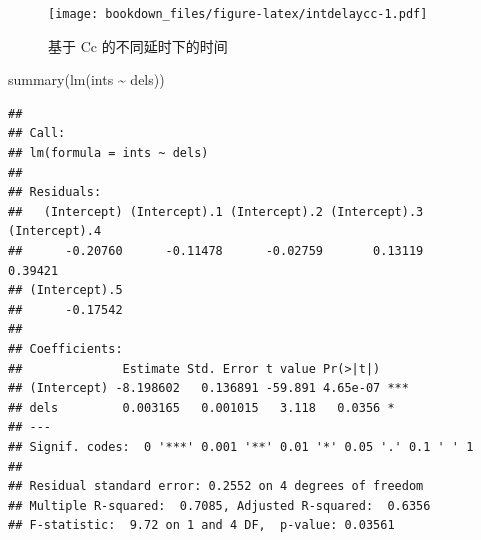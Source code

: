 \documentclass[
]{krantz}
\makeatletter
\newenvironment{Shaded}{\begin{snugshade}}{\end{snugshade}}
\newcommand{\DecValTok}[1]{\textcolor[rgb]{0.00,0.00,0.81}{#1}}
\newcommand{\FunctionTok}[1]{\textcolor[rgb]{0.00,0.00,0.00}{#1}}
\newcommand{\NormalTok}[1]{#1}
\newcommand{\OtherTok}[1]{\textcolor[rgb]{0.56,0.35,0.01}{#1}}
\newcommand{\SpecialCharTok}[1]{\textcolor[rgb]{0.00,0.00,0.00}{#1}}
\newenvironment{kframe}{%
\medskip{}
\setlength{\fboxsep}{.8em}
 \def\at@end@of@kframe{}%
 \ifinner\ifhmode%
  \def\at@end@of@kframe{\end{minipage}}%
  \begin{minipage}{\columnwidth}%
 \fi\fi%
 \def\FrameCommand##1{\hskip\@totalleftmargin \hskip-\fboxsep
 \colorbox{shadecolor}{##1}\hskip-\fboxsep
     \hskip-\linewidth \hskip-\@totalleftmargin \hskip\columnwidth}%
 \MakeFramed {\advance\hsize-\width
   \@totalleftmargin\z@ \linewidth\hsize
   \@setminipage}}%
 {\par\unskip\endMakeFramed%
 \at@end@of@kframe}
\renewenvironment{Shaded}{\begin{kframe}}{\end{kframe}}
\makeatother
\begin{document}
\begin{Shaded}
\end{Shaded}

\begin{figure}
\centering
\texttt{[image: bookdown\_files/figure-latex/intdelaycc-1.pdf]}
\caption{\label{fig:intdelaycc}基于 Cc 的不同延时下的时间}
\end{figure}

\begin{Shaded}
\begin{Highlighting}[]
\FunctionTok{summary}\NormalTok{(}\FunctionTok{lm}\NormalTok{(ints }\SpecialCharTok{\textasciitilde{}}\NormalTok{ dels))}
\end{Highlighting}
\end{Shaded}

\begin{verbatim}
## 
## Call:
## lm(formula = ints ~ dels)
## 
## Residuals:
##   (Intercept) (Intercept).1 (Intercept).2 (Intercept).3 (Intercept).4 
##      -0.20760      -0.11478      -0.02759       0.13119       0.39421 
## (Intercept).5 
##      -0.17542 
## 
## Coefficients:
##              Estimate Std. Error t value Pr(>|t|)    
## (Intercept) -8.198602   0.136891 -59.891 4.65e-07 ***
## dels         0.003165   0.001015   3.118   0.0356 *  
## ---
## Signif. codes:  0 '***' 0.001 '**' 0.01 '*' 0.05 '.' 0.1 ' ' 1
## 
## Residual standard error: 0.2552 on 4 degrees of freedom
## Multiple R-squared:  0.7085, Adjusted R-squared:  0.6356 
## F-statistic:  9.72 on 1 and 4 DF,  p-value: 0.03561
\end{verbatim}
\end{document}

